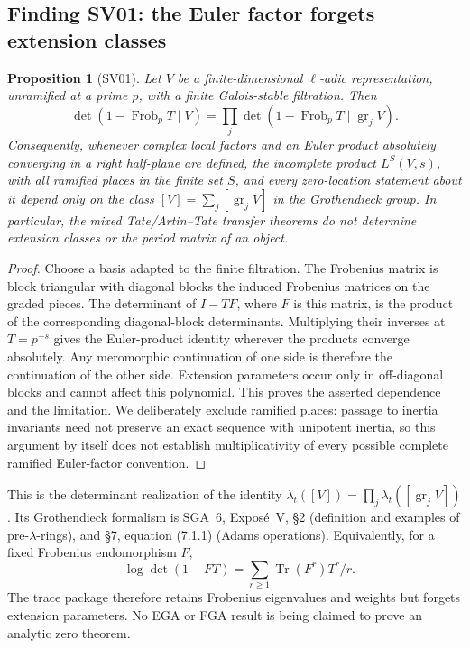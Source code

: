 \documentclass[11pt,a4paper]{article}
\newtheorem{proposition}[theorem]{Proposition}
\theoremstyle{definition}
\begin{document}
\subsection{Finding SV01: the Euler factor forgets extension classes}
\label{SV01}
\begin{proposition}[SV01]
Let \(V\) be a finite-dimensional \(\ell\)-adic representation, unramified
at a prime \(p\), with a finite Galois-stable filtration.  Then
\[
 \det(1-\operatorname{Frob}_pT\mid V)
 =\prod_j\det(1-\operatorname{Frob}_pT\mid\operatorname{gr}_jV).
\]
Consequently, whenever complex local factors and an Euler product absolutely converging
in a right half-plane are defined, the incomplete product \(L^S(V,s)\),
with all ramified places in the finite set \(S\), and every zero-location
statement about it depend only on
the class \([V]=\sum_j[\operatorname{gr}_jV]\) in the Grothendieck group.
In particular, the mixed Tate/Artin--Tate transfer theorems do not determine
extension classes or the period matrix of an object.
\end{proposition}
\begin{proof}
Choose a basis adapted to the finite filtration.  The Frobenius matrix is
block triangular with diagonal blocks the induced Frobenius matrices on the
graded pieces.  The determinant of \(I-TF\), where \(F\) is this matrix, is the product
of the corresponding diagonal-block determinants.  Multiplying their
inverses at \(T=p^{-s}\) gives the Euler-product identity wherever the
products converge absolutely.  Any meromorphic continuation of one side is
therefore the continuation of the other side.  Extension parameters occur
only in off-diagonal blocks and cannot affect this polynomial.  This proves
the asserted dependence and the limitation.  We deliberately exclude
ramified places: passage to inertia invariants need not preserve an exact
sequence with unipotent inertia, so this argument by itself does not establish
multiplicativity of every possible complete ramified Euler-factor convention.
\end{proof}

This is the determinant realization of the identity
\(\lambda_t([V])=\prod_j\lambda_t([\operatorname{gr}_jV])\).
Its Grothendieck formalism is SGA~6, Expos\'e~V, \S2 (definition and examples
of pre-\(\lambda\)-rings), and \S7, equation (7.1.1) (Adams operations).
Equivalently, for a fixed Frobenius endomorphism \(F\),
\[
 -\log\det(1-FT)=\sum_{r\geq1}\operatorname{Tr}(F^r)T^r/r.
\]
The trace package therefore retains Frobenius eigenvalues and weights but
forgets extension parameters.  No EGA or FGA result is being claimed to prove
an analytic zero theorem.
\end{document}
